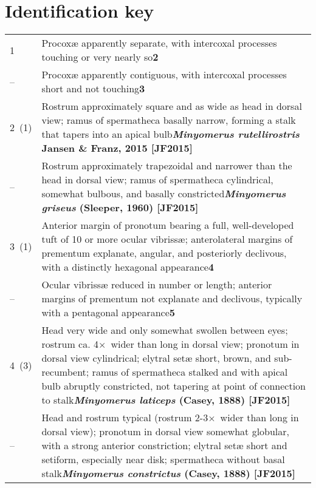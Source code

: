 \documentclass[fleqn,10pt,lineno]{wlpeerj} %
\newcommand{\x}{$\times$~}
\newcommand{\breakfill}{\dotfill\newline\penalty0\hbox{}\nobreak\dotfill}
\begin{document}
\section*{Identification key}
	\begin{xtabular}{@{}
                p{\dimexpr.1\textwidth-\tabcolsep\relax}
                p{\dimexpr.9\textwidth-\tabcolsep\relax}@{}}
                
		{1} & {Procox{\ae} apparently separate, with intercoxal processes touching or very nearly so}{\dotfill}{\textbf{2}}\\
		{--} & {Procox{\ae} apparently contiguous, with intercoxal processes short and not touching}{\dotfill}{\textbf{3}}\\
		
		{2~(1)} & {Rostrum approximately square and as wide as head in dorsal view; ramus of spermatheca basally narrow, forming a stalk that tapers into an apical bulb}{\breakfill}{\textbf{\textit{Minyomerus rutellirostris} Jansen \& Franz, 2015 [JF2015]}}\\
		{--} & {Rostrum approximately trapezoidal and narrower than the head in dorsal view; ramus of spermatheca cylindrical, somewhat bulbous, and basally constricted}{\breakfill}{\textbf{\textit{Minyomerus griseus} (Sleeper, 1960) [JF2015]}}\\
		
		{3~(1)} & {Anterior margin of pronotum bearing a full, well-developed tuft of 10 or more ocular vibriss{\ae}; anterolateral margins of prementum explanate, angular, and posteriorly declivous, with a distinctly hexagonal appearance}{\dotfill}{\textbf{4}}\\
		{--} & {Ocular vibriss{\ae} reduced in number or length; anterior margins of prementum not explanate and declivous, typically with a pentagonal appearance}{\dotfill}{\textbf{5}}\\
		
		{4~(3)} & {Head very wide and only somewhat swollen between eyes; rostrum ca. 4\x wider than long in dorsal view; pronotum in dorsal view cylindrical; elytral set{\ae} short, brown, and sub-recumbent; ramus of spermatheca stalked and with apical bulb abruptly constricted, not tapering at point of connection to stalk}{\dotfill}{\textbf{\textit{Minyomerus laticeps} (Casey, 1888) [JF2015]}}\\
		{--} & {Head and rostrum typical (rostrum 2-3\x wider than long in dorsal view); pronotum in dorsal view somewhat globular, with a strong anterior constriction; elytral set{\ae} short and setiform, especially near disk; spermatheca without basal stalk}{\breakfill}{\textbf{\textit{Minyomerus constrictus} (Casey, 1888) [JF2015]}}\\
		

\end{xtabular}
\end{document}
